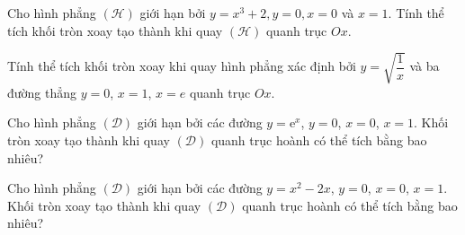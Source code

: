 \begin{bt}%
	Cho hình phẳng $(\mathcal{H})$ giới hạn bởi $y=x^3+2,y=0,x=0$ và $x=1$. Tính thể tích khối tròn xoay tạo thành khi quay $(\mathcal{H})$ quanh trục $Ox$.
\end{bt}
\begin{bt}%
	Tính thể tích khối tròn xoay khi quay hình phẳng xác định bởi $y  = \sqrt{\dfrac{1}{x}}$ và ba đường thẳng $y = 0$, $x = 1$, $x = e$ quanh trục $Ox$.
\end{bt}
\begin{bt}%
	Cho hình phẳng $(\mathcal{D})$ giới hạn bởi các đường $y=\mathrm{e}^x $, $y=0$, $x=0$, $x=1$. Khối tròn xoay tạo thành khi quay $(\mathcal{D})$ quanh trục hoành có thể tích bằng bao nhiêu?
\end{bt}
\begin{bt}%
	Cho hình phẳng $(\mathcal{D})$ giới hạn bởi các đường $y=x^2-2x$, $y=0$, $x=0$, $x=1$. Khối tròn xoay tạo thành khi quay $(\mathcal{D})$ quanh trục hoành có thể tích bằng bao nhiêu?
\end{bt}

